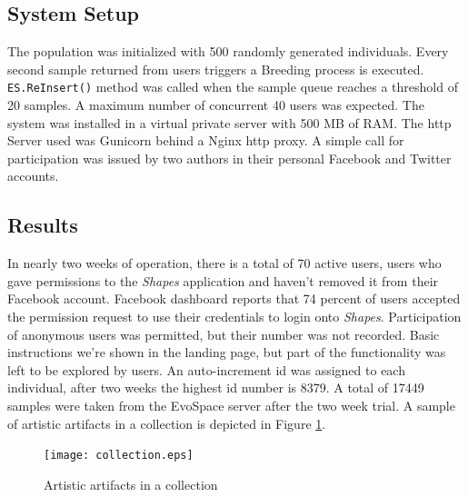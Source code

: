 \documentclass{llncs}
\begin{document}
\subsection{System Setup}
The population was initialized with 500 randomly generated individuals. Every second sample returned from users triggers a Breeding process is executed.
\texttt{ES.ReInsert()} method was called when the sample queue reaches a threshold of 20 samples.
A maximum number of concurrent 40 users was expected.
The system was installed in a virtual private server with 500 MB of RAM.
The http Server used was Gunicorn behind a Nginx http proxy.
A simple call for participation was issued by two authors in their personal Facebook and Twitter accounts.


\subsection{Results}
In nearly two weeks of operation, there is a total of 70 active users, users who gave permissions to the \emph{Shapes} application and haven't
removed it from their Facebook account.
Facebook dashboard reports that 74 percent of users accepted the permission request to use their credentials to login onto \emph{Shapes}.
Participation of anonymous users was permitted, but their number was not recorded.
Basic instructions we're shown in the landing page, but part of the functionality was left to be explored by users.
An auto-increment id was assigned to each individual, after two weeks the highest id number is 8379.
A total of 17449 samples were taken from the EvoSpace server after the two week trial. A sample of artistic artifacts in a collection is depicted in Figure \ref{fig:collection}.

\begin{figure}[t]
    \centering
        \texttt{[image: collection.eps]}
    \caption{Artistic artifacts in a collection }
    \label{fig:collection}
\end{figure}
\end{document}
